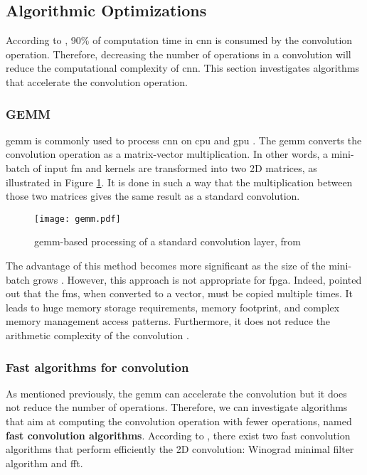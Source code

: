 \subsection{Algorithmic Optimizations} \label{subsec:algopti}
According to \textcite{shawahna_fpga-based_2019}, 90\% of computation time in \acrshort{cnn} is consumed by the convolution operation. Therefore, decreasing the number of operations in a convolution will reduce the computational complexity of \acrshort{cnn}. This section investigates algorithms that accelerate the convolution operation.
%
%
\subsubsection{GEMM}
%
\acrfull{gemm} is commonly used to process \acrshort{cnn} on \acrshort{cpu} and \acrshort{gpu} \cite{abdelouahab_accelerating_2018}. The \acrshort{gemm} converts the convolution operation as a matrix-vector multiplication. In other words, a mini-batch of input \acrshort{fm} and kernels are transformed into two 2D matrices, as illustrated in Figure \ref{fig:gemm}. It is done in such a way that the multiplication between those two matrices gives the same result as a standard convolution. 
%
\begin{figure}[H]
    \centering
    \texttt{[image: gemm.pdf]}
    \caption{\acrshort{gemm}-based processing of a standard convolution layer, from \cite{abdelouahab_accelerating_2018}}
    \label{fig:gemm}
\end{figure}
%
The advantage of this method becomes more significant as the size of the mini-batch grows \cite{abdelouahab_accelerating_2018}. However, this approach is not appropriate for \acrshort{fpga}. Indeed, \textcite{zhu_efficient_2020, sze_efficient_2017} pointed out that the \acrshort{fm}s, when converted to a vector, must be copied multiple times. It leads to huge memory storage requirements, memory footprint, and complex memory management access patterns. Furthermore, it does not reduce the arithmetic complexity of the convolution \cite{liang_evaluating_2020}.
%
\subsubsection{Fast algorithms for convolution}
%
%
As mentioned previously, the \acrshort{gemm} can accelerate the convolution but it does not reduce the number of operations. Therefore, we can investigate algorithms that aim at computing the convolution operation with fewer operations, named \textbf{fast convolution algorithms}. According to \textcite{liang_evaluating_2020}, there exist two fast convolution algorithms that perform efficiently the 2D convolution: Winograd minimal filter algorithm and \acrfull{fft}. 

